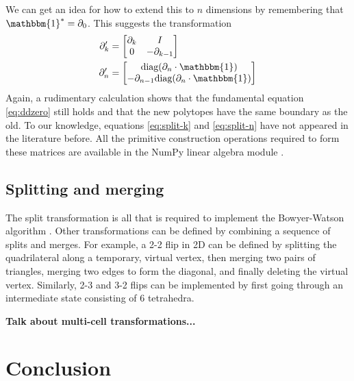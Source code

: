 \documentclass[twocolumn]{article}
\begin{document}
We can get an idea for how to extend this to $n$ dimensions by remembering that $\mathbbm{1}^* = \partial_0$.
This suggests the transformation
\begin{align}
    \partial_k' & = \left[\begin{matrix}\partial_k & I \\ 0 & -\partial_{k - 1}\end{matrix}\right] \label{eq:split-k} \\
    \partial_n' & = \left[\begin{matrix}\text{diag}(\partial_n\cdot\mathbbm{1}) \\ -\partial_{n - 1}\text{diag}(\partial_n\cdot\mathbbm{1})\end{matrix}\right] \label{eq:split-n}
\end{align}
Again, a rudimentary calculation shows that the fundamental equation \eqref{eq:ddzero} still holds and that the new polytopes have the same boundary as the old.
To our knowledge, equations \eqref{eq:split-k} and \eqref{eq:split-n} have not appeared in the literature before.
All the primitive construction operations required to form these matrices are available in the NumPy linear algebra module \cite{harris2020array}.

\subsection{Splitting and merging}

The split transformation is all that is required to implement the Bowyer-Watson algorithm \cite{bowyer1981computing, watson1981computing}.
Other transformations can be defined by combining a sequence of splits and merges.
For example, a 2-2 flip in 2D can be defined by splitting the quadrilateral along a temporary, virtual vertex, then merging two pairs of triangles, merging two edges to form the diagonal, and finally deleting the virtual vertex.
Similarly, 2-3 and 3-2 flips can be implemented by first going through an intermediate state consisting of 6 tetrahedra.

\textbf{Talk about multi-cell transformations...}


\section{Conclusion}
\end{document}
